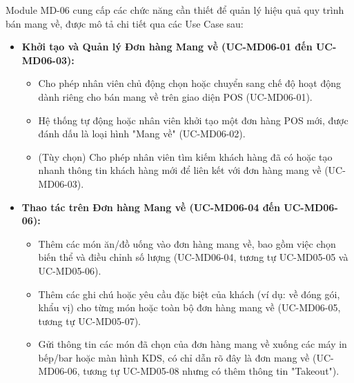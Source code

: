 \label{sssec:md06_key_functionalities}
Module MD-06 cung cấp các chức năng cần thiết để quản lý hiệu quả quy trình bán mang về, được mô tả chi tiết qua các Use Case sau:

\begin{itemize}
    \item \textbf{Khởi tạo và Quản lý Đơn hàng Mang về (UC-MD06-01 đến UC-MD06-03):}
    \begin{itemize}
        \item Cho phép nhân viên chủ động chọn hoặc chuyển sang chế độ hoạt động dành riêng cho bán mang về trên giao diện POS (UC-MD06-01).
        \item Hệ thống tự động hoặc nhân viên khởi tạo một đơn hàng POS mới, được đánh dấu là loại hình "Mang về" (UC-MD06-02).
        \item (Tùy chọn) Cho phép nhân viên tìm kiếm khách hàng đã có hoặc tạo nhanh thông tin khách hàng mới để liên kết với đơn hàng mang về (UC-MD06-03).
    \end{itemize}

    \item \textbf{Thao tác trên Đơn hàng Mang về (UC-MD06-04 đến UC-MD06-06):}
    \begin{itemize}
        \item Thêm các món ăn/đồ uống vào đơn hàng mang về, bao gồm việc chọn biến thể và điều chỉnh số lượng (UC-MD06-04, tương tự UC-MD05-05 và UC-MD05-06).
        \item Thêm các ghi chú hoặc yêu cầu đặc biệt của khách (ví dụ: về đóng gói, khẩu vị) cho từng món hoặc toàn bộ đơn hàng mang về (UC-MD06-05, tương tự UC-MD05-07).
        \item Gửi thông tin các món đã chọn của đơn hàng mang về xuống các máy in bếp/bar hoặc màn hình KDS, có chỉ dẫn rõ đây là đơn mang về (UC-MD06-06, tương tự UC-MD05-08 nhưng có thêm thông tin "Takeout").
    \end{itemize}


\end{itemize}
